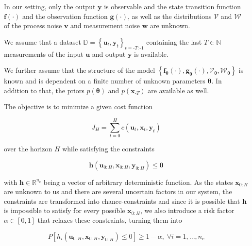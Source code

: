 In our setting, only the output $\boldsymbol{y}$ is observable and the state transition function $\boldsymbol{f}(\cdot)$ and the observation function $\boldsymbol{g}(\cdot)$, as well as the distributions $\boldsymbol{\mathcal{V}}$ and $\boldsymbol{\mathcal{W}}$ of the process noise $\boldsymbol{v}$ and measurement noise $\boldsymbol{w}$ are unknown.

We assume that a dataset $\mathbb{D} = \left\{\boldsymbol{u}_{t}, \boldsymbol{y}_{t}\right\}_{t = \text{-}T:\text{-}1}$ containing the last $T \in \mathbb{N}$ measurements of the input $\boldsymbol{u}$ and output $\boldsymbol{y}$ is available.

We further assume that the structure of the model $\left\{\boldsymbol{f}_{\boldsymbol{\theta}}(\cdot), \boldsymbol{g}_{\boldsymbol{\theta}}(\cdot), \boldsymbol{\mathcal{V}}_{\boldsymbol{\theta}}, \boldsymbol{\mathcal{W}}_{\boldsymbol{\theta}}\right\}$ is known and is dependent on a finite number of unknown parameters $\boldsymbol{\theta}$. In addition to that, the priors $p(\boldsymbol{\theta})$ and $p(\boldsymbol{x}_{\text{-}T})$ are available as well.

The objective is to minimize a given cost function 

\begin{equation} \label{cost function}
J_H = \sum_{t = 0}^H c(\boldsymbol{u}_t,  \boldsymbol{x}_t,  \boldsymbol{y}_t)
\end{equation}

over the horizon $H$ while satisfying the constraints 

\begin{equation} \label{constraints}
\boldsymbol{h}(\boldsymbol{u}_{0:H},  \boldsymbol{x}_{0:H},  \boldsymbol{y}_{0:H}) \leq \boldsymbol{0}
\end{equation}

with $\boldsymbol{h} \in \mathbb{R}^{n_c}$ being a vector of arbitrary deterministic function. As the states $\boldsymbol{x}_{0:H}$ are unknown to us and there are several uncertain factors in our system, the constraints are transformed into chance-constraints and since it is possible that $\boldsymbol{h}$ is impossible to satisfy for every possible $\boldsymbol{x}_{0:H}$, we also introduce a risk factor $\alpha \in [0, 1]$ that relaxes these constraints, turning them into

\begin{equation} \label{risk constraints}
P \left[ h_i(\boldsymbol{u}_{0:H},  \boldsymbol{x}_{0:H},  \boldsymbol{y}_{0:H}) \leq 0 \right] \geq 1 - \alpha, \; \forall i = 1,...,n_c
\end{equation}

